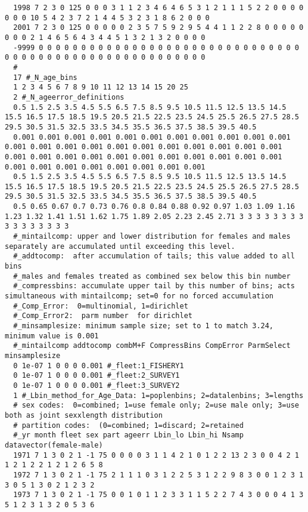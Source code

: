 \begin{landscape}
{\begin{verbatim}
  1998 7 2 3 0 125 0 0 0 3 1 1 2 3 4 6 4 6 5 3 1 2 1 1 1 5 2 2 0 0 0 0 0 0 0 10 5 4 2 3 7 2 1 4 4 5 3 2 3 1 8 6 2 0 0 0
  2001 7 2 3 0 125 0 0 0 0 0 2 3 5 7 5 9 2 9 5 4 4 1 1 2 2 8 0 0 0 0 0 0 0 0 2 1 4 6 5 6 4 3 4 4 5 1 3 2 1 3 2 0 0 0 0
  -9999 0 0 0 0 0 0 0 0 0 0 0 0 0 0 0 0 0 0 0 0 0 0 0 0 0 0 0 0 0 0 0 0 0 0 0 0 0 0 0 0 0 0 0 0 0 0 0 0 0 0 0 0 0 0 0 
  #
  17 #_N_age_bins
  1 2 3 4 5 6 7 8 9 10 11 12 13 14 15 20 25
  2 #_N_ageerror_definitions
  0.5 1.5 2.5 3.5 4.5 5.5 6.5 7.5 8.5 9.5 10.5 11.5 12.5 13.5 14.5 15.5 16.5 17.5 18.5 19.5 20.5 21.5 22.5 23.5 24.5 25.5 26.5 27.5 28.5 29.5 30.5 31.5 32.5 33.5 34.5 35.5 36.5 37.5 38.5 39.5 40.5
  0.001 0.001 0.001 0.001 0.001 0.001 0.001 0.001 0.001 0.001 0.001 0.001 0.001 0.001 0.001 0.001 0.001 0.001 0.001 0.001 0.001 0.001 0.001 0.001 0.001 0.001 0.001 0.001 0.001 0.001 0.001 0.001 0.001 0.001 0.001 0.001 0.001 0.001 0.001 0.001 0.001
  0.5 1.5 2.5 3.5 4.5 5.5 6.5 7.5 8.5 9.5 10.5 11.5 12.5 13.5 14.5 15.5 16.5 17.5 18.5 19.5 20.5 21.5 22.5 23.5 24.5 25.5 26.5 27.5 28.5 29.5 30.5 31.5 32.5 33.5 34.5 35.5 36.5 37.5 38.5 39.5 40.5
  0.5 0.65 0.67 0.7 0.73 0.76 0.8 0.84 0.88 0.92 0.97 1.03 1.09 1.16 1.23 1.32 1.41 1.51 1.62 1.75 1.89 2.05 2.23 2.45 2.71 3 3 3 3 3 3 3 3 3 3 3 3 3 3 3 3
  #_mintailcomp: upper and lower distribution for females and males separately are accumulated until exceeding this level.
  #_addtocomp:  after accumulation of tails; this value added to all bins
  #_males and females treated as combined sex below this bin number 
  #_compressbins: accumulate upper tail by this number of bins; acts simultaneous with mintailcomp; set=0 for no forced accumulation
  #_Comp_Error:  0=multinomial, 1=dirichlet
  #_Comp_Error2:  parm number  for dirichlet
  #_minsamplesize: minimum sample size; set to 1 to match 3.24, minimum value is 0.001
  #_mintailcomp addtocomp combM+F CompressBins CompError ParmSelect minsamplesize
  0 1e-07 1 0 0 0 0.001 #_fleet:1_FISHERY1
  0 1e-07 1 0 0 0 0.001 #_fleet:2_SURVEY1
  0 1e-07 1 0 0 0 0.001 #_fleet:3_SURVEY2
  1 #_Lbin_method_for_Age_Data: 1=poplenbins; 2=datalenbins; 3=lengths
  # sex codes:  0=combined; 1=use female only; 2=use male only; 3=use both as joint sexxlength distribution
  # partition codes:  (0=combined; 1=discard; 2=retained
  #_yr month fleet sex part ageerr Lbin_lo Lbin_hi Nsamp datavector(female-male)
  1971 7 1 3 0 2 1 -1 75 0 0 0 0 3 1 1 4 2 1 0 1 2 2 13 2 3 0 0 4 2 1 1 2 1 2 2 1 2 1 2 6 5 8
  1972 7 1 3 0 2 1 -1 75 2 1 1 1 0 3 1 2 2 5 3 1 2 2 9 8 3 0 0 1 2 3 1 3 0 5 1 3 0 2 1 2 3 2
  1973 7 1 3 0 2 1 -1 75 0 0 1 0 1 1 2 3 3 1 1 5 2 2 7 4 3 0 0 0 4 1 3 5 1 2 3 1 3 2 0 5 3 6

\end{verbatim}}
\end{landscape}
